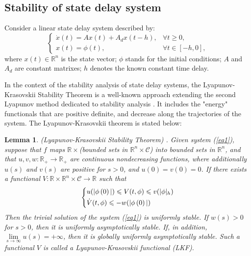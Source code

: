 \documentclass[a4paper]{cas-sc}
\newtheorem{lemma}[theorem]{Lemma}
\begin{document}
\subsection{Stability of state delay system}
\label{Section 2.2}

Consider a linear state delay system described by:
\begin{equation}
  \left\{ {\begin{array}{*{20}{l}}
        {\dot x(t) = Ax(t) + {A_d}x(t - h),} & {\forall t \geqslant 0,}  \\
        {x(t) = \phi (t),}                   & {\forall t \in [ - h,0],}
      \end{array}} \right.
  \label{eq1}
\end{equation}
where $x(t) \in {\mathbb{R}^n}$ is the state vector; $ \phi $ stands for the initial conditions; $A $ and $A_d $ are constant matrixes; $ h$ denotes the known constant time delay.

In the context of the stability analysis of state delay systems, the Lyapunov-Krasovskii Stability Theorem is a well-known approach extending the second Lyapunov method dedicated to stability analysis \citep{Gu2003}. It includes the "energy" functionals that are positive definite, and decrease along the trajectories of the system. The Lyapunov-Krasovskii theorem is stated below:
\begin{lemma}
  \label{lemma1}
  (Lyapunov-Krasovskii Stability Theorem) \citep{Gu2009}. Given system (\ref{eq1}), suppose that $f$ maps $\mathbb{R} \times  $(bounded sets in ${\mathbb{R}^n} \times \mathcal{C} $) into bounded sets in ${\mathbb{R}^n} $, and that $u,v,w:{\mathbb{R}_ + } \to {\mathbb{R}_ + } $ are continuous nondecreasing functions, where additionally $u(s) $ and $v(s) $ are positive for $s > 0 $, and $u(0) = v(0) = 0 $. If there exists a functional $V:\mathbb{R} \times {\mathbb{R}^n} \times \mathcal{C} \to \mathbb{R} $ such that
  \begin{equation}
    \left\{ \begin{gathered}
      u(|\phi \left( 0 \right)|) \leqslant V(t,\phi ) \leqslant v(|\phi {|_h}) \hfill \\
      \dot V(t,\phi ) \leqslant  - w(|\phi \left( 0 \right)|) \hfill \\
    \end{gathered}  \right.
  \end{equation}
  Then the trivial solution of the system (\ref{eq1}) is uniformly stable. If $w(s) > 0 $ for $s > 0 $, then it is uniformly asymptotically stable. If, in addition, $\mathop {\lim }\limits_{s \to \infty } u(s) =  + \infty  $, then it is globally uniformly asymptotically stable. Such a functional $V $ is called a Lyapunov-Krasovskii functional (LKF).
\end{lemma}
\end{document}
